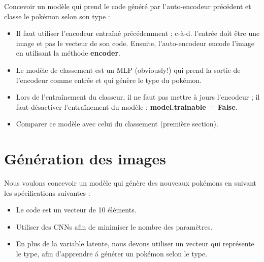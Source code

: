 \documentclass[11pt, a4paper]{article}
\begin{document}
Concevoir un modèle qui prend le code généré par l'auto-encodeur précédent et classe le pokémon selon son type : 
\begin{itemize}
	\item Il faut utiliser l'encodeur entraîné précédemment ; c-à-d. l'entrée doit être une image et pas le vecteur de son code. 
	Ensuite, l'auto-encodeur encode l'image en utilisant la méthode \textbf{encoder}.
	\item Le modèle de classement est un MLP (obviously!) qui prend la sortie de l'encodeur comme entrée et qui génère le type du pokémon.
	\item Lors de l'entraînement du classeur, il ne faut pas mettre à jours l'encodeur ; il faut désactiver l'entraînement du modèle : \textbf{model.trainable = False}.
	\item Comparer ce modèle avec celui du classement (première section).
\end{itemize}

\section{Génération des images}

Nous voulons concevoir un modèle qui génère des nouveaux pokémons en suivant les spécifications suivantes : 
\begin{itemize}
	\item Le code est un vecteur de 10 éléments.
	\item Utiliser des CNNs afin de minimiser le nombre des paramètres.
	\item En plus de la variable latente, nous devons utiliser un vecteur qui représente le type, afin d'apprendre \'a générer un pokémon selon le type.
\end{itemize}
\end{document}
